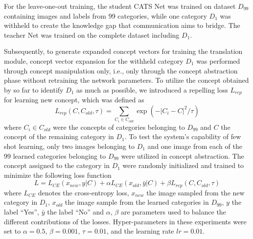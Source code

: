 \documentclass[pdflatex,sn-mathphys-num,lineno]{sn-jnl}%
\begin{document}
\begin{CJK}{UTF8}{gbsn}
For the leave-one-out training, the student CATS Net was trained on dataset $D_{99}$ containing images and labels from 99 categories, while one category $D_1$ was withheld to create the knowledge gap that communication aims to bridge. The teacher Net was trained on the complete dataset including $D_1$. 

Subsequently, to generate expanded concept vectors for training the translation module, concept vector expansion for the withheld category $D_1$ was performed through concept manipulation only, i.e., only through the concept abstraction phase without retraining the network parameters. To utilize the concept obtained by so far to identify $D_1$ as much as possible, we introduced a repelling loss $L_{rep}$ for learning new concept, which was defined as
$$L_{rep}(C, C_{old}, \tau) = \sum_{C_i \in C_{old}} \exp (-|C_i - C|^2/\tau)$$
where $C_i \in C_{old}$ were the concepts of categories belonging to $D_{99}$ and $C$ the concept of the remaining category in $D_1$. To test the system’s capability of few shot learning, only two images belonging to $D_1$ and one image from each of the $99$ learned categories belonging to $D_{99}$ were utilized in concept abstraction. The concept assigned to the category in $D_1$ were randomly initialized and trained to minimize the following loss function
$$L = L_{CE}(x_{new},y|C) + \alpha L_{CE}(x_{old},\bar{y}|C) + \beta L_{rep}(C, C_{old}, \tau)$$
where $L_{CE}$ denotes the cross-entropy loss, $x_{new}$ the image sampled from the new category in $D_1$, $x_{old}$ the image sample from the learned categories in $D_{99}$, $y$ the label “Yes”, $\bar{y}$ the label “No” and $\alpha$, $\beta$ are parameters used to balance the different contributions of the losses. Hyper-parameters in these experiments were set to $\alpha = 0.5$, $\beta = 0.001$, $\tau = 0.01$, and the learning rate $ lr = 0.01$. 


\end{CJK}
\end{document}
